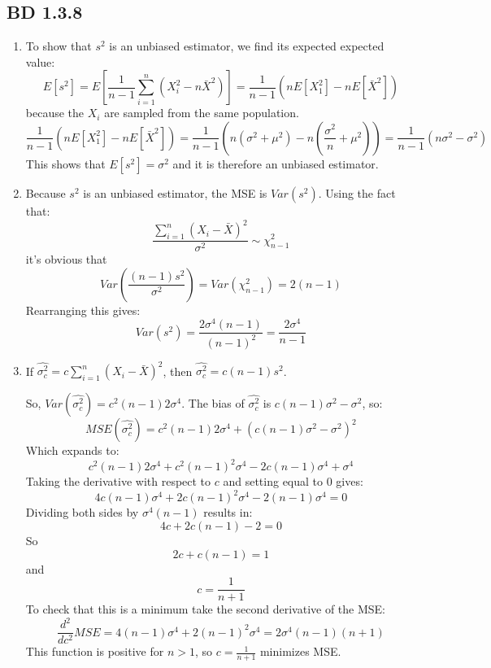 \documentclass[a4paper,12pt]{article}
\begin{document}
\subsection{BD 1.3.8}
\begin{enumerate}
  \item To show that $s^2$ is an unbiased estimator, we find its expected expected value:$$E[s^2]=E[\frac{1}{n-1}\sum_{i=1}^{n}(X_i^2-n\bar{X}^2)]=\frac{1}{n-1}(nE[X_1^2]-nE[\bar{X}^2])$$ because the $X_i$ are sampled from the same population. $$\frac{1}{n-1}(nE[X_1^2]-nE[\bar{X}^2])=\frac{1}{n-1}(n(\sigma^2+\mu^2)-n(\frac{\sigma^2}{n}+\mu^2))=\frac{1}{n-1}(n\sigma^2-\sigma^2)$$
  This shows that $E[s^2]=\sigma^2$ and it is therefore an unbiased estimator.
  \item Because $s^2$ is an unbiased estimator, the MSE is $Var(s^2)$. Using the fact that: $$\frac{\sum_{i=1}^n(X_i-\bar{X})^2}{\sigma^2}\sim\chi_{n-1}^2$$ it's obvious that $$Var(\frac{(n-1)s^2}{\sigma^2})=Var(\chi_{n-1}^2)=2(n-1)$$
  Rearranging this gives:$$Var(s^2)=\frac{2\sigma^4(n-1)}{(n-1)^2}=\frac{2\sigma^4}{n-1}$$
  \item If $\hat{\sigma^2_c}=c\sum_{i=1}^n(X_i-\bar{X})^2$, then $\hat{\sigma^2_c}=c(n-1)s^2$.

  So, $Var(\hat{\sigma^2_c})=c^2(n-1)2\sigma^4$. The bias of $\hat{\sigma^2_c}$ is $c(n-1)\sigma^2-\sigma^2$, so:$$MSE(\hat{\sigma^2_c})=c^2(n-1)2\sigma^4+(c(n-1)\sigma^2-\sigma^2)^2$$
  Which expands to: $$c^2(n-1)2\sigma^4+c^2(n-1)^2\sigma^4-2c(n-1)\sigma^4+\sigma^4$$
  Taking the derivative with respect to $c$ and setting equal to 0 gives:
  $$4c(n-1)\sigma^4+2c(n-1)^2\sigma^4-2(n-1)\sigma^4=0$$
  Dividing both sides by $\sigma^4(n-1)$ results in:
  $$4c+2c(n-1)-2=0$$
  So $$2c+c(n-1)=1$$ and $$c=\frac{1}{n+1}$$
  To check that this is a minimum take the second derivative of the MSE:
  $$\frac{d^2}{dc^2}MSE=4(n-1)\sigma^4+2(n-1)^2\sigma^4=2\sigma^4(n-1)(n+1)$$
  This function is positive for $n>1$, so $c=\frac{1}{n+1}$ minimizes MSE.
\end{enumerate}
\end{document}
